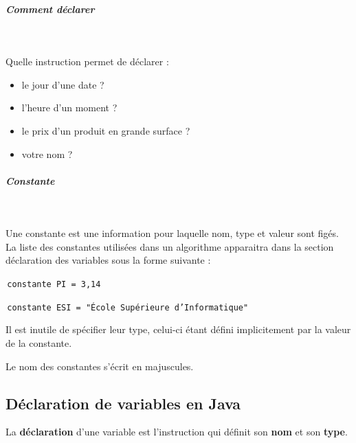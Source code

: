 \documentclass[11pt,a4paper]{article}
\begin{document}
            \par
        
			
		\subparagraph{Comment d\'eclarer} 
		
                \textcolor{white}{.} \par
            
							  Quelle instruction permet de d\'eclarer :
							
					\begin{itemize}
				
			\item le jour d'une date ? \textcolor{gray}{\underline{\hspace*{10em}}} 
			\item l'heure d'un moment ?  \textcolor{gray}{\underline{\hspace*{10em}}} 
			\item le prix d'un produit en grande surface ? \textcolor{gray}{\underline{\hspace*{10em}}} 
			\item votre nom ?  \textcolor{gray}{\underline{\hspace*{10em}}} 
					\end{itemize}
				
			
		\subparagraph{Constante} 
		
					\textcolor{white}{.} \par
				
				  Une constante est une information pour laquelle nom, type et valeur sont fig\'es.
          La liste des constantes utilis\'ees dans un algorithme apparaitra dans la section d\'eclaration des variables sous la forme suivante : 
        
            \par
        \,\verb|constante PI = 3,14|\,
            \par
        \,\verb|constante ESI = "École Supérieure d’Informatique"|\,
            \par
        
          Il est inutile de sp\'ecifier leur type, celui-ci \'etant d\'efini implicitement par la valeur de la constante.
        
            \par
        
          Le nom des constantes s'\'ecrit en majuscules.
        
            \par
        \subsection{D\'eclaration de variables en Java}
          La \textbf{d\'eclaration} d'une variable est l'instruction qui d\'efinit son \textbf{nom} 
          et son \textbf{type}.
        
\end{document}

